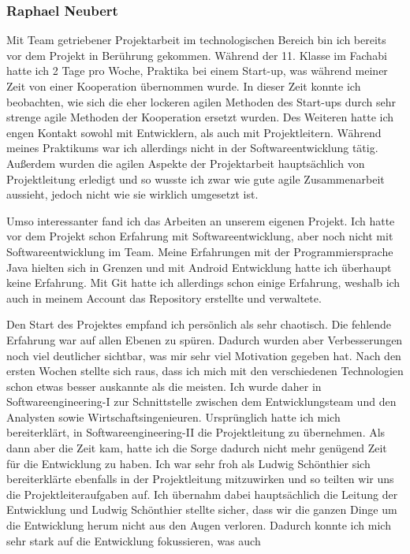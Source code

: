 \documentclass[10pt]{article}
\begin{document}
\subsubsection{Raphael Neubert}
Mit Team getriebener Projektarbeit im technologischen Bereich bin ich bereits vor dem Projekt in
Berührung gekommen. Während der 11. Klasse im Fachabi hatte ich 2 Tage pro
Woche, Praktika bei einem Start-up, was während meiner Zeit von einer Kooperation
übernommen wurde. In dieser Zeit konnte ich beobachten, wie sich die
eher lockeren agilen Methoden des Start-ups durch sehr strenge agile Methoden
der Kooperation ersetzt wurden. Des Weiteren hatte ich engen Kontakt sowohl
mit Entwicklern, als auch mit Projektleitern. Während meines Praktikums war ich allerdings
nicht in der Softwareentwicklung tätig. Außerdem wurden die agilen Aspekte der Projektarbeit hauptsächlich von
Projektleitung erledigt und so wusste ich zwar wie gute agile Zusammenarbeit aussieht, jedoch nicht wie sie wirklich
umgesetzt ist.\par
\medskip
Umso interessanter fand ich das Arbeiten an unserem eigenen Projekt. Ich hatte vor dem Projekt schon
Erfahrung mit Softwareentwicklung, aber noch nicht mit Softwareentwicklung im Team. Meine Erfahrungen mit der
Programmiersprache Java hielten sich in Grenzen und mit Android Entwicklung hatte ich überhaupt keine Erfahrung.
Mit Git hatte ich allerdings schon einige Erfahrung, weshalb ich auch in meinem Account das Repository erstellte
und verwaltete.\par
\medskip
Den Start des Projektes empfand ich persönlich als sehr chaotisch. Die fehlende Erfahrung war auf allen Ebenen
zu spüren. Dadurch wurden aber Verbesserungen noch viel deutlicher sichtbar, was mir sehr viel Motivation gegeben
hat. Nach den ersten Wochen stellte sich raus, dass ich mich mit den verschiedenen Technologien schon etwas besser auskannte
als die meisten. Ich wurde daher in Softwareengineering-I zur Schnittstelle zwischen dem Entwicklungsteam und den
Analysten sowie Wirtschaftsingenieuren. Ursprünglich hatte ich mich bereiterklärt, in Softwareengineering-II die
Projektleitung zu übernehmen. Als dann aber die Zeit kam, hatte ich die Sorge dadurch nicht mehr genügend Zeit
für die Entwicklung zu haben. Ich war sehr froh als Ludwig Schönthier sich bereiterklärte ebenfalls in der
Projektleitung mitzuwirken und so teilten wir uns die Projektleiteraufgaben auf. Ich übernahm dabei hauptsächlich
die Leitung der Entwicklung und Ludwig Schönthier stellte sicher, dass wir die ganzen Dinge um die Entwicklung
herum nicht aus den Augen verloren. Dadurch konnte ich mich sehr stark auf die Entwicklung fokussieren, was auch
\end{document}
